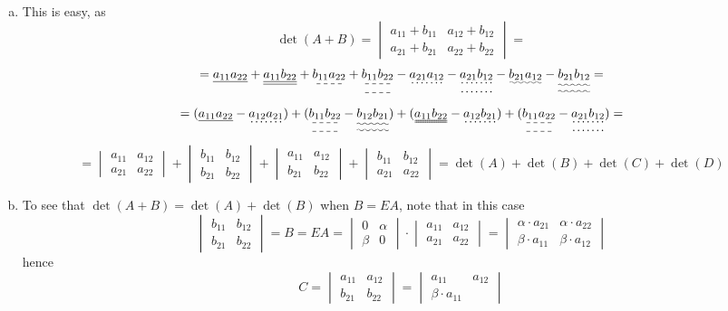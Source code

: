 \documentclass[8pt]{article} %
\begin{document}
\begin{description}
{	\begin{enumerate}[(a)]
		\item{
			This is easy, as
			\[\det(A+B)=\begin{vmatrix}a_{11}+b_{11}&a_{12}+b_{12}\\a_{21}+b_{21}&a_{22}+b_{22}\end{vmatrix}=\]
				\[=\underline{a_{11}a_{22}}+\underline{\underline{a_{11}b_{22}}}+\dashuline{b_{11}a_{22}}+
				\dashuline{\dashuline{b_{11}b_{22}}}-\dotuline{a_{21}a_{12}}-\dotuline{\dotuline{a_{21}b_{12}}}
				-\uwave{b_{21}a_{12}}-\uwave{\uwave{b_{21}b_{12}}}=\]
				\[=(\uline{a_{11}a_{22}}-\dotuline{a_{12}a_{21}})+(\dashuline{\dashuline{b_{11}b_{22}}}-
				\uwave{\uwave{b_{12}b_{21}}})+(\uuline{a_{11}b_{22}}-\dotuline{a_{12}b_{21}})+(\dashuline{
				\dashuline{b_{11}a_{22}}}-\dotuline{\dotuline{a_{21}b_{12}}})=\]
				\[=\begin{vmatrix}a_{11}&a_{12}\\a_{21}&a_{22}\end{vmatrix}+\begin{vmatrix}b_{11}&b_{12}\\b_{21}&b_{22}
				\end{vmatrix}+\begin{vmatrix}a_{11}&a_{12}\\b_{21}&b_{22}
				\end{vmatrix}+\begin{vmatrix}b_{11}&b_{12}\\a_{21}&a_{22}\end{vmatrix}=\det(A)+\det(B)+\det(C)+\det(D)\]
				}
		\item{To see that $\det(A+B)=\det(A)+\det(B)$ when $B=EA$, note that in this case 
			\[\begin{vmatrix}b_{11}&b_{12}\\b_{21}&b_{22}\end{vmatrix}=
			B=EA=\begin{vmatrix}0&\alpha\\\beta&0\end{vmatrix}\cdot\begin{vmatrix}a_{11}&a_{12}\\a_{21}&a_{22}\end{vmatrix}=
				\begin{vmatrix}\alpha\cdot a_{21}&\alpha\cdot a_{22}\\\beta\cdot a_{11}&\beta\cdot a_{12}\end{vmatrix}\]
			hence
			\[C=\begin{vmatrix}a_{11}&a_{12}\\b_{21}&b_{22}\end{vmatrix}=\begin{vmatrix}a_{11}&a_{12}\\\beta\cdot a_{11}&

\end{vmatrix}\]}
\end{enumerate}}
\end{description}
\end{document}
